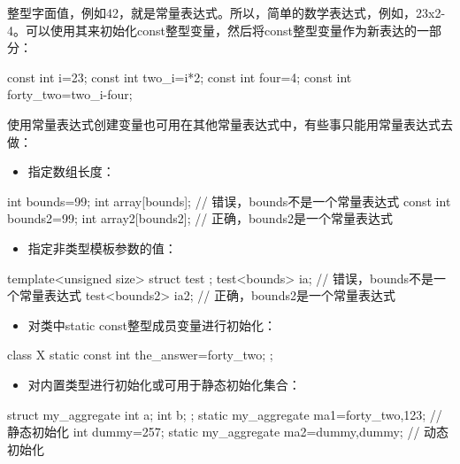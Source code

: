 
整型字面值，例如42，就是常量表达式。所以，简单的数学表达式，例如，23x2-4。可以使用其来初始化const整型变量，然后将const整型变量作为新表达的一部分：

\begin{cpp}
const int i=23;
const int two_i=i*2;
const int four=4;
const int forty_two=two_i-four;
\end{cpp}

使用常量表达式创建变量也可用在其他常量表达式中，有些事只能用常量表达式去做：

\begin{itemize}
\item 指定数组长度：
\end{itemize}

\begin{cpp}
int bounds=99;
int array[bounds];  // 错误，bounds不是一个常量表达式
const int bounds2=99;
int array2[bounds2];  // 正确，bounds2是一个常量表达式
\end{cpp}

\begin{itemize}
\item 指定非类型模板参数的值：
\end{itemize}

\begin{cpp}
template<unsigned size>
struct test
{};
test<bounds> ia;  // 错误，bounds不是一个常量表达式
test<bounds2> ia2;  // 正确，bounds2是一个常量表达式
\end{cpp}

\begin{itemize}
\item 对类中static const整型成员变量进行初始化：
\end{itemize}

\begin{cpp}
class X
{
  static const int the_answer=forty_two;
};
\end{cpp}

\begin{itemize}
\item 对内置类型进行初始化或可用于静态初始化集合：
\end{itemize}

\begin{cpp}
struct my_aggregate
{
  int a;
  int b;
};
static my_aggregate ma1={forty_two,123};  // 静态初始化
int dummy=257;
static my_aggregate ma2={dummy,dummy};  // 动态初始化
\end{cpp}

